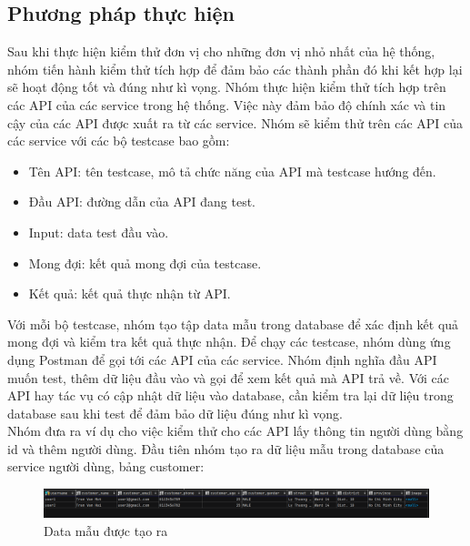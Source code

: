 \subsection{Phương pháp thực hiện}

Sau khi thực hiện kiểm thử đơn vị cho những đơn vị nhỏ nhất của hệ thống, nhóm tiến hành kiểm thử tích hợp để đảm bảo các thành phần đó khi kết hợp lại sẽ hoạt động tốt và đúng như kì vọng. Nhóm thực hiện kiểm thử tích hợp trên các API của các service trong hệ thống. Việc này đảm bảo độ chính xác và tin cậy của các API được xuất ra từ các service. Nhóm sẽ kiểm thử trên các API của các service với các bộ testcase bao gồm:
\begin{itemize}
    \item Tên API: tên testcase, mô tả chức năng của API mà testcase hướng đến.
    \item Đầu API: đường dẫn của API đang test.
    \item Input: data test đầu vào.
    \item Mong đợi: kết quả mong đợi của testcase.
    \item Kết quả: kết quả thực nhận từ API.
\end{itemize}

Với mỗi bộ testcase, nhóm tạo tập data mẫu trong database để xác định kết quả mong đợi và kiểm tra kết quả thực nhận. Để chạy các testcase, nhóm dùng ứng dụng Postman để gọi tới các API của các service. Nhóm định nghĩa đầu API muốn test, thêm dữ liệu đầu vào và gọi để xem kết quả mà API trả về. Với các API hay tác vụ có cập nhật dữ liệu vào database, cần kiểm tra lại dữ liệu trong database sau khi test để đảm bảo dữ liệu đúng như kì vọng.\\

Nhóm đưa ra ví dụ cho việc kiểm thử cho các API lấy thông tin người dùng bằng id và thêm người dùng. Đầu tiên nhóm tạo ra dữ liệu mẫu trong database của service người dùng, bảng customer:

\begin{figure}[!htp]
    \begin{center}
        \includegraphics[width=15cm]{img/testing/sample_db.PNG}
    \end{center}
    \caption{Data mẫu được tạo ra}
\end{figure}

